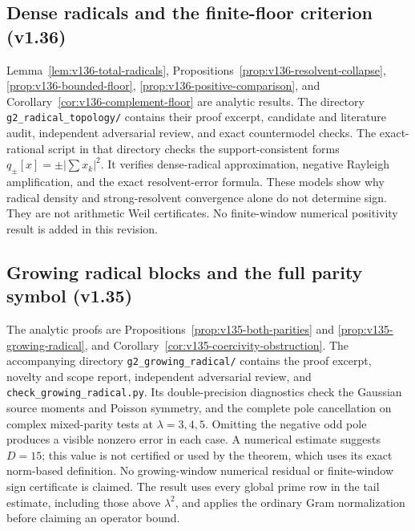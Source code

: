 \documentclass[11pt]{article}
\theoremstyle{remark}
\begin{document}
\subsection*{Dense radicals and the finite-floor criterion (v1.36)}
Lemma~\ref{lem:v136-total-radicals},
Propositions~\ref{prop:v136-resolvent-collapse},
\ref{prop:v136-bounded-floor}, \ref{prop:v136-positive-comparison}, and
Corollary~\ref{cor:v136-complement-floor} are analytic results. The directory
\texttt{g2\_radical\_topology/} contains their proof excerpt, candidate and
literature audit, independent adversarial review, and exact countermodel
checks. The exact-rational script in that directory checks the support-consistent forms
$q_\pm[x]=\pm|\sum x_k|^2$. It verifies dense-radical approximation,
negative Rayleigh amplification, and the exact resolvent-error formula.
These models show why radical density and strong-resolvent convergence
alone do not determine sign. They are not arithmetic Weil certificates.
No finite-window numerical positivity result is added in this revision.

\subsection*{Growing radical blocks and the full parity symbol (v1.35)}
The analytic proofs are Propositions~\ref{prop:v135-both-parities} and
\ref{prop:v135-growing-radical}, and
Corollary~\ref{cor:v135-coercivity-obstruction}.  The accompanying directory
\texttt{g2\_growing\_radical/} contains the proof excerpt, novelty and
scope report, independent adversarial review, and
\texttt{check\_growing\_radical.py}.  Its double-precision diagnostics check
the Gaussian source moments and Poisson symmetry, and the complete pole
cancellation on complex mixed-parity tests at $\lambda=3,4,5$.
Omitting the negative odd pole produces a visible nonzero error in each
case.  A numerical estimate suggests $D=15$; this value is not certified
or used by the theorem, which uses its exact norm-based definition.
No growing-window numerical residual or finite-window sign certificate is
claimed.  The result uses every global prime row in the tail estimate,
including those above $\lambda^2$, and applies the ordinary Gram
normalization before claiming an operator bound.
\end{document}
